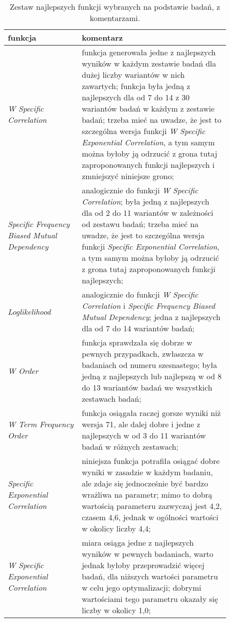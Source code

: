 \begin{table}[h!]
\centering
\begin{tabular}{ p{0.3\linewidth} | p{0.6\linewidth} }
	\toprule
	\textbf{funkcja}	& \textbf{komentarz}	\\
	\midrule
	\emph{W Specific Correlation}	& funkcja generowała jedne z najlepszych wyników w każdym zestawie badań dla dużej liczby wariantów w nich zawartych; funkcja była jedną z najlepszych dla od 7 do 14 z 30 wariantów badań w każdym z zestawie badań; trzeba mieć na uwadze, że jest to szczególna wersja funkcji \emph{W Specific Exponential Correlation}, a tym samym można byłoby ją odrzucić z grona tutaj zaproponowanych funkcji najlepszych i zmniejszyć niniejsze grono; \\
	\hline
	\emph{Specific Frequency Biased Mutual Dependency}	& analogicznie do funkcji \emph{W Specific Correlation}; była jedną z najlepszych dla od 2 do 11 wariantów w zależności od zestawu badań; trzeba mieć na uwadze, że jest to szczególna wersja funkcji \emph{Specific Exponential Correlation}, a tym samym można byłoby ją odrzucić z grona tutaj zaproponowanych funkcji najlepszych; \\
	\hline
	\emph{Loglikelihood}	& analogicznie do funkcji \emph{W Specific Correlation} i \emph{Specific Frequency Biased Mutual Dependency}; jedna z najlepszych dla od 7 do 14 wariantów badań;\\
	\hline
	\emph{W Order}	& funkcja sprawdzała się dobrze w pewnych przypadkach, zwłaszcza w badaniach od numeru szesnastego; była jedną z najlepszych lub najlepszą w od 8 do 13 wariantów badań we wszystkich zestawach badań;\\
	\hline
	\emph{W Term Frequency Order}	& funkcja osiągała raczej gorsze wyniki niż wersja 71, ale dalej dobre i jedne z najlepszych w od 3 do 11 wariantów badań w różnych zestawach;\\
	\hline
	\emph{Specific Exponential Correlation}	& niniejsza funkcja potrafiła osiągać dobre wyniki w zasadzie w każdym badaniu, ale zdaje się jednocześnie być bardzo wrażliwa na parametr; mimo to dobrą wartością parameteru zazwyczaj jest 4,2, czasem 4,6, jednak w ogólności wartości w okolicy liczby 4,4; \\
	\hline
	\emph{W Specific Exponential Correlation}	& miara osiąga jedne z najlepszych wyników w pewnych badaniach, warto jednak byłoby przeprowadzić więcej badań, dla niższych wartości parametru w celu jego optymalizacji; dobrymi wartościami tego parametru okazały się liczby w okolicy 1,0;\\
	\bottomrule
\end{tabular}
\caption[Zestaw najlepszych funkcji wybranych na podstawie badań, z komentarzami]{Zestaw najlepszych funkcji wybranych na podstawie badań, z komentarzami.}
\label{ending_best_measures}
\end{table}

